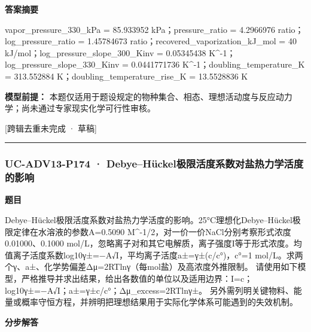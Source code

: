 \documentclass[UTF8,11pt,a4paper]{ctexart}
\begin{document}
\noindent\textbf{答案摘要}\par
vapor\_pressure\_330\_kPa = 85.933952 kPa；pressure\_ratio = 4.2966976 ratio；log\_pressure\_ratio = 1.45784673 ratio；recovered\_vaporization\_kJ\_mol = 40 kJ/mol；log\_pressure\_slope\_300\_Kinv = 0.05345438 K\textasciicircum{}-1；log\_pressure\_slope\_330\_Kinv = 0.0441771736 K\textasciicircum{}-1；doubling\_temperature\_K = 313.552884 K；doubling\_temperature\_rise\_K = 13.5528836 K\par
\noindent\textbf{模型前提：}
本题仅适用于题设规定的物种集合、相态、理想活动度与反应动力学；尚未通过专家现实化学可行性审核。\par
\noindent\textcolor{red!65!black}{[跨辑去重未完成 · 草稿]} \par
\medskip\hrule\medskip
{}
\subsubsection*{UC-ADV13-P174 · Debye–Hückel极限活度系数对盐热力学活度的影响}
\noindent\textbf{题目}\par
Debye–Hückel极限活度系数对盐热力学活度的影响。25°C理想化Debye–Hückel极限定律在水溶液的参数A=0.5090 M\textasciicircum{}-1/2，对一价一价NaCl分别考察形式浓度0.01000、0.1000 mol/L，忽略离子对和其它电解质，离子强度I等于形式浓度。均值离子活度系数log10γ±=−A√I，平均离子活度a±=γ±(c/c°)，c°=1 mol/L。求两个γ、a±、化学势偏差Δμ=2RTlnγ（每mol盐）及高浓度外推限制。 请使用如下模型，严格推导并求出结果，给出各数值的单位以及适用边界：I=c；log10γ±=−A√I；a±=γ±c/c°；Δμ\_excess=2RTlnγ±。 另外需列明关键物料、能量或概率守恒方程，并辨明把理想结果用于实际化学体系可能遇到的失效机制。\par
\medskip\noindent\textbf{分步解答}
\end{document}
